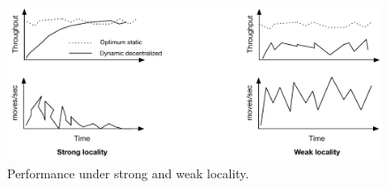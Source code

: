 
\begin{figure}[ht]
	\center
	\includegraphics[width=0.6\linewidth]{figures/motivation}
	\caption{Performance under strong and weak locality.}
	\label{fig:motivation}
\end{figure}











